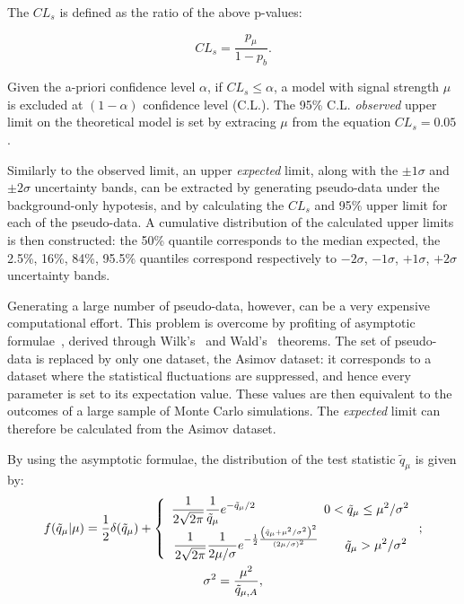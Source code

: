 \noindent The $CL_s$ is defined as the ratio of the above p-values:

\begin{equation}
CL_s = \frac{ p_{\mu} }{ 1 - p_b}.
\end{equation}

\noindent Given the a-priori confidence level $\alpha$, if $CL_s \leq \alpha$, a model with signal strength $\mu$ is excluded at $(1 - \alpha)$ confidence level (C.L.). The 95\% C.L. \emph{observed} upper limit on the theoretical model is set by extracing $\mu$ from the equation $CL_s = 0.05$.

\noindent Similarly to the observed limit, an upper \emph{expected} limit, along with the $\pm 1 \sigma$ and $\pm 2 \sigma$ uncertainty bands, can be extracted by generating pseudo-data under the background-only hypotesis, and by calculating the $CL_s$ and 95\% upper limit for each of the pseudo-data. A cumulative distribution of the calculated upper limits is then constructed: the 50\% quantile corresponds to the median expected, the 2.5\%, 16\%, 84\%, 95.5\% quantiles correspond respectively to $-2 \sigma$, $-1 \sigma$, $+1 \sigma$, $+2 \sigma$ uncertainty bands.

\noindent Generating a large number of pseudo-data, however, can be a very expensive computational effort. This problem is overcome by profiting of asymptotic formulae~\cite{bib:Asymptotic}, derived through Wilk's~\cite{bib:Wilks} and Wald's~\cite{10.2307/1990256} theorems. The set of pseudo-data is replaced by only one dataset, the Asimov dataset: it corresponds to a dataset where the statistical fluctuations are suppressed, and hence every parameter is set to its expectation value. These values are then equivalent to the outcomes of a large sample of Monte Carlo simulations. The \emph{expected} limit can therefore be calculated from the Asimov dataset.

\noindent By using the asymptotic formulae, the distribution of the test statistic $\tilde{q}_{\mu}$ is given by:
\begin{equation}
\begin{gathered}
f(\tilde{q}_{\mu}|\mu) = \frac{1}{2} \delta (\tilde{q}_{\mu}) + 
\left\{
\begin{array}{l}
\begin{gathered}
\frac{1}{2 \sqrt{2 \pi}} \frac{1}{\tilde{q}_{\mu}} e^{-\tilde{q}_{\mu}/2} \text{ \hspace*{1.8cm}} 0 < \tilde{q}_{\mu} \leq \mu^2 / \sigma^2\\
\frac{1}{2 \sqrt{2 \pi}} \frac{1}{2 \mu / \sigma} e^ {-\frac{1}{2} \frac{\left(\tilde{q}_{\mu}  + \mu^2 / \sigma^2 \right)^2}{\left( 2 \mu / \sigma \right)^2}  } \text{ \hspace*{0.5cm}  } \tilde{q}_{\mu} > \mu^2 / \sigma^2\\
\end{gathered}
\end{array}
\right. ; \\
\sigma^2 = \frac{\mu^2}{ \tilde{q}_{\mu, A}},
\end{gathered}
\end{equation}

